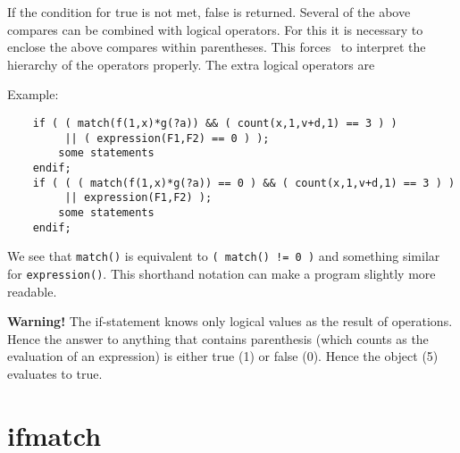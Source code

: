 \leftvitem{2cm}{$=$}
 
\leftvitem{2cm}{$==$}
 
\leftvitem{2cm}{$>=$}
 
\leftvitem{2cm}{$<=$}
 
\leftvitem{2cm}{$!=$}

If the condition for true is not met, false is returned. Several of the 
above compares can be combined with logical operators. For this it is 
necessary to enclose the above compares within parentheses. This forces 
\FORM\ to interpret the hierarchy of the operators 
properly. The extra logical operators are
 
\leftvitem{2cm}{$||$}
 
\leftvitem{2cm}{$\&\&$}

\noindent Example:
\begin{verbatim}
    if ( ( match(f(1,x)*g(?a)) && ( count(x,1,v+d,1) == 3 ) )
         || ( expression(F1,F2) == 0 ) );
        some statements
    endif;
    if ( ( ( match(f(1,x)*g(?a)) == 0 ) && ( count(x,1,v+d,1) == 3 ) )
         || expression(F1,F2) );
        some statements
    endif;
\end{verbatim}
We see that \verb:match(): is equivalent to \verb:( match() != 0 ): and 
something similar for \verb:expression():. This shorthand 
notation can make a program slightly more readable.

{\bf Warning! } The if-statement knows only logical values as the result of 
operations. Hence the answer to anything that contains parenthesis (which 
counts as the evaluation of an expression) is either true (1) or false (0). 
Hence the object (5) evaluates to true. \vspace{10mm}


\section{ifmatch}
\label{substaifmatch}

